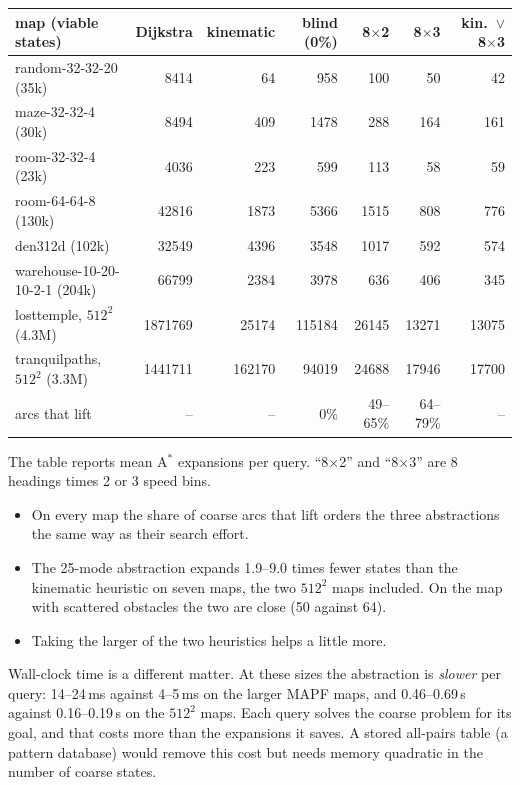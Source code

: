 \documentclass[11pt]{article}
\theoremstyle{definition}
\theoremstyle{remark}
\begin{document}
\begin{center}
\small
\begin{tabular}{lrrrrrr}
\toprule
map (viable states) & Dijkstra & kinematic & blind (0\%) & 8$\times$2 & 8$\times$3 & kin.\ $\vee$ 8$\times$3 \\
\midrule
random-32-32-20 (35k) & 8414 & 64 & 958 & 100 & 50 & 42 \\
maze-32-32-4 (30k) & 8494 & 409 & 1478 & 288 & 164 & 161 \\
room-32-32-4 (23k) & 4036 & 223 & 599 & 113 & 58 & 59 \\
room-64-64-8 (130k) & 42816 & 1873 & 5366 & 1515 & 808 & 776 \\
den312d (102k) & 32549 & 4396 & 3548 & 1017 & 592 & 574 \\
warehouse-10-20-10-2-1 (204k) & 66799 & 2384 & 3978 & 636 & 406 & 345 \\
\midrule
losttemple, $512^2$ (4.3M) & 1871769 & 25174 & 115184 & 26145 & 13271 & 13075 \\
tranquilpaths, $512^2$ (3.3M) & 1441711 & 162170 & 94019 & 24688 & 17946 & 17700 \\
\midrule
arcs that lift & -- & -- & 0\% & 49--65\% & 64--79\% & -- \\
\bottomrule
\end{tabular}
\end{center}

The table reports mean A$^*$ expansions per query. ``8$\times$2'' and ``8$\times$3''
are 8 headings times 2 or 3 speed bins.
\begin{itemize}[nosep]
\item On every map the share of coarse arcs that lift orders the three abstractions
  the same way as their search effort.
\item The 25-mode abstraction expands 1.9--9.0 times fewer states than the
  kinematic heuristic on seven maps, the two $512^2$ maps included. On the map with
  scattered obstacles the two are close (50 against 64).
\item Taking the larger of the two heuristics helps a little more.
\end{itemize}

Wall-clock time is a different matter. At these sizes the abstraction is
\emph{slower} per query: 14--24\,ms against 4--5\,ms on the larger MAPF maps, and
0.46--0.69\,s against 0.16--0.19\,s on the $512^2$ maps. Each
query solves the coarse problem for its goal, and that costs more than the
expansions it saves. A stored all-pairs table (a pattern database) would remove
this cost but needs memory quadratic in the number of coarse states.
\end{document}
